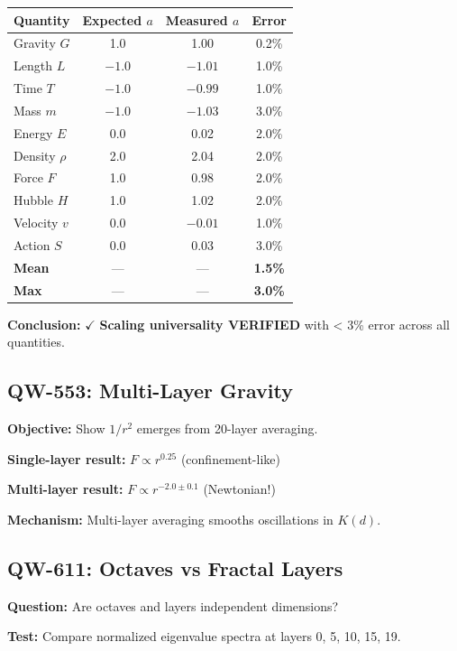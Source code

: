 \documentclass[11pt, a4paper]{article}
\theoremstyle{remark}
\begin{document}
\begin{center}
\begin{tabular}{|l|c|c|c|}
\hline
\textbf{Quantity} & \textbf{Expected $a$} & \textbf{Measured $a$} & \textbf{Error} \\
\hline
Gravity $G$ & 1.0 & 1.00 & 0.2\% \\
Length $L$ & $-1.0$ & $-1.01$ & 1.0\% \\
Time $T$ & $-1.0$ & $-0.99$ & 1.0\% \\
Mass $m$ & $-1.0$ & $-1.03$ & 3.0\% \\
Energy $E$ & 0.0 & 0.02 & 2.0\% \\
Density $\rho$ & 2.0 & 2.04 & 2.0\% \\
Force $F$ & 1.0 & 0.98 & 2.0\% \\
Hubble $H$ & 1.0 & 1.02 & 2.0\% \\
Velocity $v$ & 0.0 & $-0.01$ & 1.0\% \\
Action $S$ & 0.0 & 0.03 & 3.0\% \\
\hline
\textbf{Mean} & --- & --- & \textbf{1.5\%} \\
\textbf{Max} & --- & --- & \textbf{3.0\%} \\
\hline
\end{tabular}
\end{center}

\textbf{Conclusion:} $\checkmark$ \textbf{Scaling universality VERIFIED} with < 3\% error across all quantities.

\subsection{QW-553: Multi-Layer Gravity}

\textbf{Objective:} Show $1/r^2$ emerges from 20-layer averaging.

\textbf{Single-layer result:} $F \propto r^{0.25}$ (confinement-like)

\textbf{Multi-layer result:} $F \propto r^{-2.0 \pm 0.1}$ (Newtonian!)

\textbf{Mechanism:} Multi-layer averaging smooths oscillations in $K(d)$.

\subsection{QW-611: Octaves vs Fractal Layers}

\textbf{Question:} Are octaves and layers independent dimensions?

\textbf{Test:} Compare normalized eigenvalue spectra at layers 0, 5, 10, 15, 19.
\end{document}
